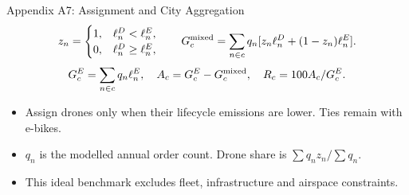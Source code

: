 \documentclass[9pt]{beamer}
\begin{document}
\begin{frame}{Appendix A7: Assignment and City Aggregation}
\label{app:emission:7}
\[
z_n=\begin{cases}1,&\ell_n^D<\ell_n^E,\\0,&\ell_n^D\geq\ell_n^E,\end{cases}
\qquad G_c^{\rm mixed}=\sum_{n\in c}q_n[z_n\ell_n^D+(1-z_n)\ell_n^E].
\]
\[
G_c^E=\sum_{n\in c}q_n\ell_n^E,\quad A_c=G_c^E-G_c^{\rm mixed},\quad
R_c=100A_c/G_c^E.
\]
\begin{itemize}
\item Assign drones only when their lifecycle emissions are lower. Ties remain with e-bikes.
\item $q_n$ is the modelled annual order count. Drone share is $\sum q_nz_n/\sum q_n$.
\item This ideal benchmark excludes fleet, infrastructure and airspace constraints.
\end{itemize}
\end{frame}
\end{document}
